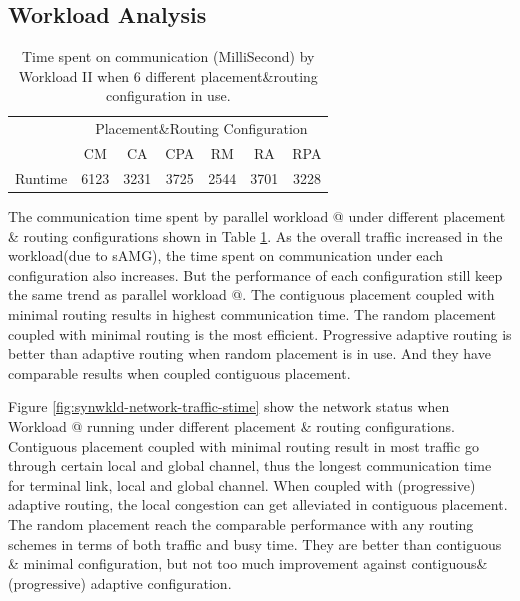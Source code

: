 \documentclass[conference,compsoc]{IEEEtran}
\makeatletter
\newcommand{\Rmnum}[1]{\expandafter\@slowromancap\romannumeral #1@}
\makeatother
\begin{document}
\subsection{Workload Analysis}


\begin{table}[ht]
\begin{center}
\caption{Time spent on communication (MilliSecond) by Workload II when 6 different placement\&routing configuration in use.} 
\label{tab:syn-wkld-commtime}
\begin{tabular}{l c c c c c c }
\toprule %
\toprule
&\multicolumn{6}{c}{Placement\&Routing Configuration} \\ %
\cmidrule(l){2-7}
	 & CM & CA & CPA & RM & RA & RPA \\ %
\midrule %
Runtime  &  6123 & 3231 & 3725 & 2544 & 3701 & 3228 \\ %

\midrule %
\bottomrule %
\end{tabular}
\end{center}
\end{table}


The communication time spent by parallel workload \Rmnum{2} under different placement \& routing configurations shown in Table \ref{tab:syn-wkld-commtime}. As the overall traffic increased in the workload(due to sAMG), the time spent on communication under each configuration also increases. But the performance of each configuration still keep the same trend as parallel workload \Rmnum{1}. The contiguous placement coupled with minimal routing results in highest communication time. The random placement coupled with minimal routing is the most efficient. Progressive adaptive routing is better than adaptive routing when random placement is in use. And they have comparable results when coupled contiguous placement. 


Figure \ref{fig:synwkld-network-traffic-stime} show the network status when Workload \Rmnum{2} running under different placement \& routing configurations. Contiguous placement coupled with minimal routing result in most traffic go through certain local and global channel, thus the longest  communication time for terminal link, local and global channel. When coupled with (progressive) adaptive routing, the local congestion can get alleviated in contiguous placement. The random placement reach the comparable performance with any routing schemes in terms of both traffic and busy time. They are better than contiguous \& minimal configuration, but not too much improvement against contiguous\&(progressive) adaptive configuration.
\end{document}
